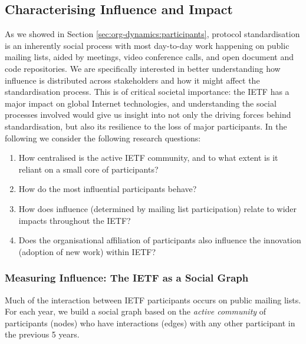 \documentclass[twocolumn,10pt]{article}
\begin{document}
\subsection{Characterising Influence and Impact}
\label{sec:org-dynamics:influence}



As we showed in Section \ref{sec:org-dynamics:participants}, protocol
standardisation is an inherently social process with most day-to-day work
happening on public mailing lists, aided by meetings, video conference
calls, and open document and code repositories.  We are specifically
interested in better understanding how influence is distributed across
stakeholders and how it might affect the standardisation process.  This is
of critical societal importance: the IETF has a major impact on global
Internet technologies, and understanding the social processes involved
would give us insight into not only the driving forces behind
standardisation, but also its resilience to the loss of major participants.
In the following we consider the following research questions: 
\begin{enumerate}
  \item How centralised is the active IETF community, and to what extent
    is it reliant on a small core of participants? 
  \item How do the most influential participants behave? 
  \item How does influence (determined by mailing list participation)
    relate to wider impacts throughout the IETF?
  \item Does the organisational affiliation of participants also
    influence the innovation (adoption of new work) within IETF?
\end{enumerate}

\subsubsection{Measuring Influence: The IETF as a Social Graph}

\label{subsec:measuring_influence}

Much of the interaction between IETF participants occurs on public mailing
lists.  For each year, we build a social graph based on the \emph{active
community} of participants (nodes) who have interactions (edges) with any
other participant in the previous 5 years. 
\end{document}
